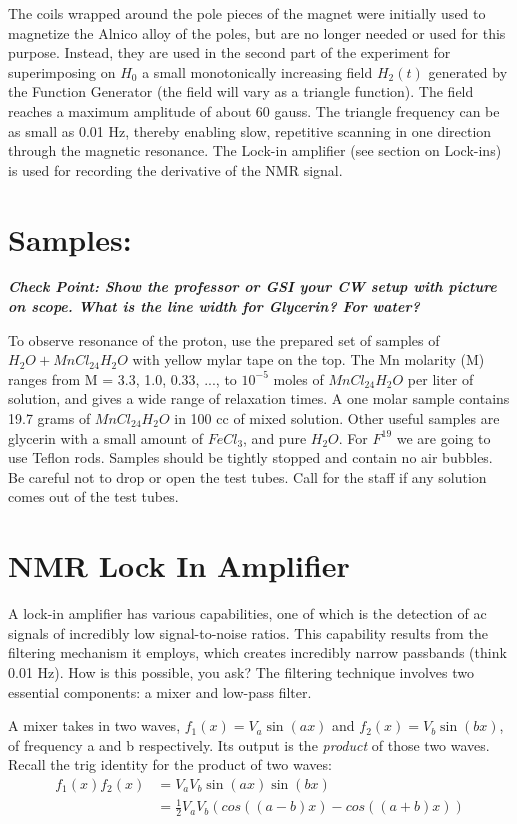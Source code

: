 \documentclass{../lab}
\begin{document}
The coils wrapped around the pole pieces of the magnet were initially used to magnetize the Alnico alloy of the poles, but are no longer needed or used for this purpose. Instead, they are used in the second part of the experiment for superimposing on $H_0$ a small monotonically increasing field ${H_2(t)}$ generated by the Function Generator (the field will vary as a triangle function). The field reaches a maximum amplitude of about 60 gauss. The triangle frequency can be as small as 0.01 Hz, thereby enabling slow, repetitive scanning in one direction through the magnetic resonance. The Lock-in amplifier (see section on Lock-ins) is used for recording the derivative of the NMR signal.

\section{Samples:}

\emph{\textbf{Check Point: Show the professor or GSI your CW setup with picture on scope. What is the line width for Glycerin? For water?}}

To observe resonance of the proton, use the prepared set of samples of $ {H_2O + MnCl_24H_2O }$ with yellow mylar tape on the top. The Mn molarity (M) ranges from M = 3.3, 1.0, 0.33, ..., to ${10^{-5}}$ moles of ${ MnCl_24H_2O }$ per liter of solution, and gives a wide range of relaxation times. A one molar sample contains 19.7 grams of $ {MnCl_24H_2O }$ in 100 cc of mixed solution. Other useful samples are glycerin with a small amount of $ {FeCl_3 }$, and pure $ {H_2O }$. For ${ F^{19} }$ we are going to use Teflon rods. Samples should be tightly stopped and contain no air bubbles. Be careful not to drop or open the test tubes. Call for the staff if any solution comes out of the test tubes.

\section{NMR Lock In Amplifier}

A lock-in amplifier has various capabilities, one of which is the detection of ac signals of incredibly low signal-to-noise ratios. This capability results from the filtering mechanism it employs, which creates incredibly narrow passbands (think 0.01 Hz). How is this possible, you ask? The filtering technique involves two essential components: a mixer and low-pass filter.

A mixer takes in two waves,  ${f_{1}(x) = V_{a}\sin(ax)}$  and  ${f_{2}(x) = V_{b}\sin(bx) }$, of frequency a and b respectively. Its output is the \emph{product} of those two waves. Recall the trig identity for the product of two waves:
\begin{align*}
f_{1} (x) f_{2} (x) &= V_{a} V_{b} \sin(ax)\sin(bx) \\
&= \frac{1}{2} V_{a} V_{b}(cos((a-b)x) - cos((a+b)x)) \\
\end{align*}
\end{document}
